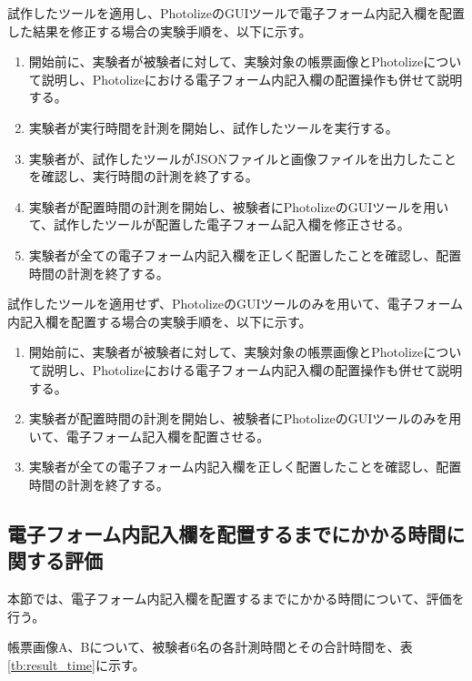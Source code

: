 試作したツールを適用し、PhotolizeのGUIツールで電子フォーム内記入欄を配置した結果を修正する場合の実験手順を、以下に示す。

\begin{enumerate}
    \item 開始前に、実験者が被験者に対して、実験対象の帳票画像とPhotolizeについて説明し、Photolizeにおける電子フォーム内記入欄の配置操作も併せて説明する。
    \item 実験者が実行時間を計測を開始し、試作したツールを実行する。
    \item 実験者が、試作したツールがJSONファイルと画像ファイルを出力したことを確認し、実行時間の計測を終了する。
    \item 実験者が配置時間の計測を開始し、被験者にPhotolizeのGUIツールを用いて、試作したツールが配置した電子フォーム記入欄を修正させる。
    \item 実験者が全ての電子フォーム内記入欄を正しく配置したことを確認し、配置時間の計測を終了する。
\end{enumerate}

試作したツールを適用せず、PhotolizeのGUIツールのみを用いて、電子フォーム内記入欄を配置する場合の実験手順を、以下に示す。

\begin{enumerate}
    \item 開始前に、実験者が被験者に対して、実験対象の帳票画像とPhotolizeについて説明し、Photolizeにおける電子フォーム内記入欄の配置操作も併せて説明する。
    \item 実験者が配置時間の計測を開始し、被験者にPhotolizeのGUIツールのみを用いて、電子フォーム記入欄を配置させる。
    \item 実験者が全ての電子フォーム内記入欄を正しく配置したことを確認し、配置時間の計測を終了する。
\end{enumerate}

\subsection{電子フォーム内記入欄を配置するまでにかかる時間に関する評価}\label{subsec:evalue_required_time}
本節では、電子フォーム内記入欄を配置するまでにかかる時間について、評価を行う。

帳票画像A、Bについて、被験者6名の各計測時間とその合計時間を、表\ref{tb:result_time}に示す。

